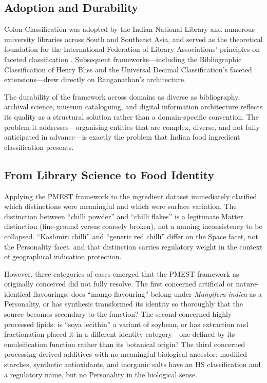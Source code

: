 \documentclass[12pt,a3paper]{article}
\begin{document}
\subsection{Adoption and Durability}

Colon Classification was adopted by the Indian National Library and numerous university libraries across South and Southeast Asia, and served as the theoretical foundation for the International Federation of Library Associations' principles on faceted classification \cite{Broughton_CC_2006}. Subsequent frameworks---including the Bibliographic Classification of Henry Bliss and the Universal Decimal Classification's faceted extensions---drew directly on Ranganathan's architecture.

The durability of the framework across domains as diverse as bibliography, archival science, museum cataloguing, and digital information architecture reflects its quality as a structural solution rather than a domain-specific convention. The problem it addresses---organising entities that are complex, diverse, and not fully anticipated in advance---is exactly the problem that Indian food ingredient classification presents.

\subsection{From Library Science to Food Identity}

Applying the PMEST framework to the ingredient dataset immediately clarified which distinctions were meaningful and which were surface variation. The distinction between ``chilli powder'' and ``chilli flakes'' is a legitimate Matter distinction (fine-ground versus coarsely broken), not a naming inconsistency to be collapsed. ``Kashmiri chilli'' and ``generic red chilli'' differ on the Space facet, not the Personality facet, and that distinction carries regulatory weight in the context of geographical indication protection.

However, three categories of cases emerged that the PMEST framework as originally conceived did not fully resolve. The first concerned artificial or nature-identical flavourings: does ``mango flavouring'' belong under \textit{Mangifera indica} as a Personality, or has synthesis transformed its identity so thoroughly that the source becomes secondary to the function? The second concerned highly processed lipids: is ``soya lecithin'' a variant of soybean, or has extraction and fractionation placed it in a different identity category---one defined by its emulsification function rather than its botanical origin? The third concerned processing-derived additives with no meaningful biological ancestor: modified starches, synthetic antioxidants, and inorganic salts have an HS classification and a regulatory name, but no Personality in the biological sense.
\end{document}
